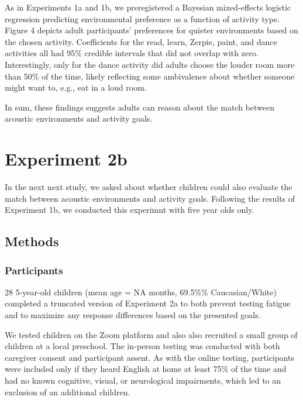 \documentclass[10pt, letterpaper]{article}
\begin{document}
As in Experiments 1a and 1b, we preregistered a Bayesian mixed-effects
logistic regression predicting environmental preference as a function of
activity type. Figure 4 depicts adult participants' preferences for
quieter environments based on the chosen activity. Coefficients for the
read, learn, Zerpie, paint, and dance activities all had 95\% credible
intervals that did not overlap with zero. Interestingly, only for the
dance activity did adults choose the louder room more than 50\% of the
time, likely reflecting some ambivalence about whether someone might
want to, e.g., eat in a loud room.

In sum, these findings suggests adults can reason about the match
between acoustic environments and activity goals.

\hypertarget{experiment-2b}{%
\section{Experiment 2b}\label{experiment-2b}}

In the next next study, we asked about whether children could also
evaluate the match between acoustic environments and activity goals.
Following the results of Experiment 1b, we conducted this experimnt with
five year olds only.

\hypertarget{methods-3}{%
\subsection{Methods}\label{methods-3}}

\hypertarget{participants-3}{%
\subsubsection{Participants}\label{participants-3}}

28 5-year-old children (mean age = NA months, 69.5\%\% Caucasian/White)
completed a truncated version of Experiment 2a to both prevent testing
fatigue and to maximize any response differences based on the presented
goals.

We tested children on the Zoom platform and also also recruited a small
group of children at a local preschool. The in-person testing was
conducted with both caregiver consent and participant assent. As with
the online testing, participants were included only if they heard
English at home at least 75\% of the time and had no known cognitive,
visual, or neurological impairments, which led to an exclusion of an
additional children.
\end{document}
